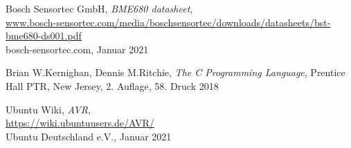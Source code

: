 \documentclass[12pt, a4paper, oneside]{report}
\begin{document}
\begin{thebibliography}{9}
  Bosch Sensortec GmbH,
  \textit{BME680 datasheet},\\
  \url{www.bosch-sensortec.com/media/boschsensortec/downloads/datasheets/bst-bme680-ds001.pdf}\\
  bosch-sensortec.com,
  Januar 2021

  Brian W.Kernighan, Dennis M.Ritchie,
  \textit{The C Programming Language},
  Prentice Hall PTR, New Jersey,
  2. Auflage, 58. Druck 2018
  
  Ubuntu Wiki,
  \textit{AVR},\\
  \url{https://wiki.ubuntuusers.de/AVR/}\\
  Ubuntu Deutschland e.V.,
  Januar 2021

\end{thebibliography}
\end{document}
